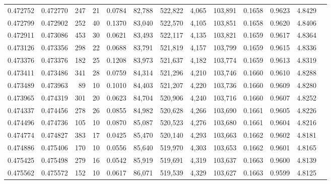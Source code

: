 \begin{tabular}{rrrrrrrrrrrrr}
0.472752 & 0.472770 &   247 &    21 &                                     0.0784 &  82,788 & 522,822 &   4,065 & 103,891 & 0.1658 & 0.9623 & 4.8429 \\
0.472799 & 0.472902 &   252 &    40 &                                     0.1370 &  83,040 & 522,570 &   4,105 & 103,851 & 0.1658 & 0.9620 & 4.8406 \\
0.472911 & 0.473086 &   453 &    30 &                                     0.0621 &  83,493 & 522,117 &   4,135 & 103,821 & 0.1659 & 0.9617 & 4.8364 \\
0.473126 & 0.473356 &   298 &    22 &                                     0.0688 &  83,791 & 521,819 &   4,157 & 103,799 & 0.1659 & 0.9615 & 4.8336 \\
0.473376 & 0.473376 &   182 &    25 &                                     0.1208 &  83,973 & 521,637 &   4,182 & 103,774 & 0.1659 & 0.9613 & 4.8319 \\
0.473411 & 0.473486 &   341 &    28 &                                     0.0759 &  84,314 & 521,296 &   4,210 & 103,746 & 0.1660 & 0.9610 & 4.8288 \\
0.473489 & 0.473963 &    89 &    10 &                                     0.1010 &  84,403 & 521,207 &   4,220 & 103,736 & 0.1660 & 0.9609 & 4.8280 \\
0.473965 & 0.474319 &   301 &    20 &                                     0.0623 &  84,704 & 520,906 &   4,240 & 103,716 & 0.1660 & 0.9607 & 4.8252 \\
0.474337 & 0.474456 &   278 &    26 &                                     0.0855 &  84,982 & 520,628 &   4,266 & 103,690 & 0.1661 & 0.9605 & 4.8226 \\
0.474496 & 0.474736 &   105 &    10 &                                     0.0870 &  85,087 & 520,523 &   4,276 & 103,680 & 0.1661 & 0.9604 & 4.8216 \\
0.474774 & 0.474827 &   383 &    17 &                                     0.0425 &  85,470 & 520,140 &   4,293 & 103,663 & 0.1662 & 0.9602 & 4.8181 \\
0.474886 & 0.475406 &   170 &    10 &                                     0.0556 &  85,640 & 519,970 &   4,303 & 103,653 & 0.1662 & 0.9601 & 4.8165 \\
0.475425 & 0.475498 &   279 &    16 &                                     0.0542 &  85,919 & 519,691 &   4,319 & 103,637 & 0.1663 & 0.9600 & 4.8139 \\
0.475562 & 0.475572 &   152 &    10 &                                     0.0617 &  86,071 & 519,539 &   4,329 & 103,627 & 0.1663 & 0.9599 & 4.8125 \\

\end{tabular}
